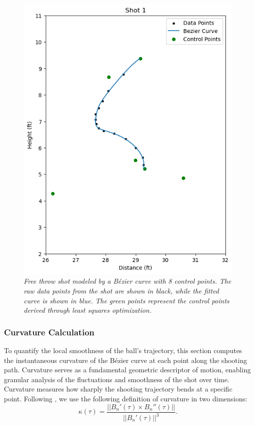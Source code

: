\documentclass{article}
\begin{document}
            \begin{figure}
                \centering
                \includegraphics[scale=0.4]{shot1.png}
                \caption{\it Free throw shot modeled by a Bézier curve with 8 control points. The raw data points from the shot are shown in black, while the fitted curve is shown in blue. The green points represent the control points derived through least squares optimization.}
                \label{fig:free-throw-bezier}
            \end{figure}

        \subsubsection{Curvature Calculation}

          To quantify the local smoothness of the ball’s trajectory, this section computes the instantaneous curvature of the Bézier curve at each point along the shooting path. Curvature serves as a fundamental geometric descriptor of motion, enabling granular analysis of the fluctuations and smoothness of the shot over time. Curvature measures how sharply the shooting trajectory bends at a specific point. Following \citet{slegers_role_2024}, we use the following definition of curvature in two dimensions:
          \[
            \kappa(\tau) = \frac{||B_n'(\tau) \times B_n''(\tau)||}{||B_n'(\tau)||^3}.
          \]
          
\end{document}
